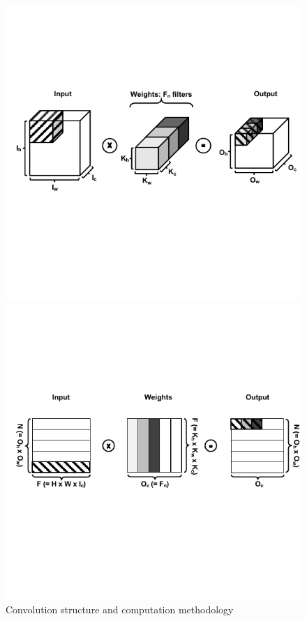 \begin{figure}[t]
    \centering
    \begin{minipage}[t][]{\linewidth}
        \centering
        \includegraphics[width=0.9\linewidth]{figure/conv_lower1.pdf}
    \end{minipage}
    \begin{minipage}[t][]{\linewidth}
        \centering
        \includegraphics[width=0.9\linewidth]{figure/conv_lower2.pdf}
    \end{minipage}
    \caption{Convolution structure and computation methodology}
    \label{fig:mot:conv}
\end{figure}

